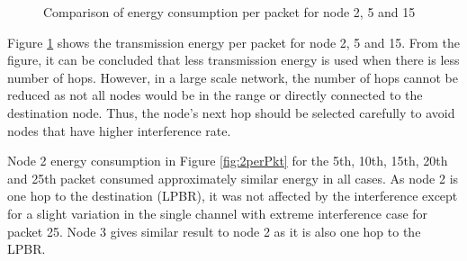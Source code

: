 \begin{figure}
\centering
{}                
\caption{Comparison of energy consumption per packet for node 2, 5 and 15}
\label{fig:energyPerPkt}
\end{figure}

Figure \ref{fig:energyPerPkt} shows the transmission energy per packet for node 2, 5 and 15. From the figure, it can be concluded that less transmission energy is used when there is less number of hops. However, in a large scale network, the number of hops cannot be reduced as not all nodes would be in the range or directly connected to the destination node. Thus, the node's next hop should be selected carefully to avoid nodes that have higher interference rate.

Node 2 energy consumption in Figure \ref{fig:2perPkt} for the 5th, 10th, 15th, 20th and 25th packet consumed approximately similar energy in all cases. As node 2 is one hop to the destination (LPBR), it was not affected by the interference except for a slight variation in the single channel with extreme interference case for packet 25. Node 3 gives similar result to node 2 as it is also one hop to the LPBR. 

